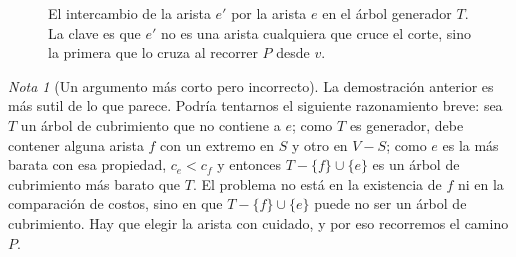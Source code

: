 \documentclass[12pt, spanish, oneside, openany]{book}
\theoremstyle{uprightplain}
\theoremstyle{definition}
\theoremstyle{remark}
\newtheorem{nota}[teorema]{Nota}
\theoremstyle{definition}
\begin{document}
\begin{figure}[H]
\centering
{}
\caption{El intercambio de la arista $e'$ por la arista $e$ en el árbol
generador $T$. La clave es que $e'$ no es una arista cualquiera que cruce el
corte, sino la primera que lo cruza al recorrer $P$ desde $v$.}
\label{fig:propiedad-corte}
\end{figure}

\begin{nota}[Un argumento más corto pero incorrecto]
La demostración anterior es más sutil de lo que parece. Podría tentarnos el siguiente razonamiento breve: sea $T$ un árbol de cubrimiento que no contiene a $e$; como $T$ es generador, debe contener alguna arista $f$ con un extremo en $S$ y otro en $V-S$; como $e$ es la más barata con esa propiedad, $c_e<c_f$ y entonces $T-\{f\}\cup\{e\}$ es un árbol de cubrimiento más barato que $T$. El problema no está en la existencia de $f$ ni en la comparación de costos, sino en que $T-\{f\}\cup\{e\}$ puede no ser un árbol de cubrimiento. Hay que elegir la arista con cuidado, y por eso recorremos el camino $P$.
\end{nota}
\end{document}
